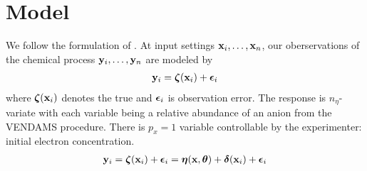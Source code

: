 \section{Model}

We follow the formulation of \cite{higdon:2008}. At input settings $\mathbf{\bm{x}}_i,\ldots,\mathbf{\bm{x}}_n$, our oberservations of the chemical process $\mathbf{\bm{y}}_i,\ldots,\mathbf{\bm{y}}_n$ are modeled by
\begin{eqnarray}
\mathbf{\bm{y}}_i = \mathbf{\bm{\zeta}}(\mathbf{\bm{x}}_i) + \mathbf{\bm{\epsilon}}_i
\end{eqnarray}
where $\mathbf{\bm{\zeta}}(\mathbf{\bm{x}}_i)$ denotes the true and $\mathbf{\bm{\epsilon}}_i$ is observation error. The response is $n_\eta$-variate with each variable being a relative abundance of an anion from the VENDAMS procedure. There is $p_x=1$ variable controllable by the experimenter: initial electron concentration.
\begin{eqnarray}
\mathbf{\bm{y}}_i = \mathbf{\bm{\zeta}}(\mathbf{\bm{x}}_i)  + \mathbf{\bm{\epsilon}}_i = \mathbf{\bm{\eta}}(\mathbf{\bm{x}}, \mathbf{\bm{\theta}}) + \mathbf{\bm{\delta}}(\mathbf{\bm{x}}_i) + \mathbf{\bm{\epsilon}}_i
\end{eqnarray}
